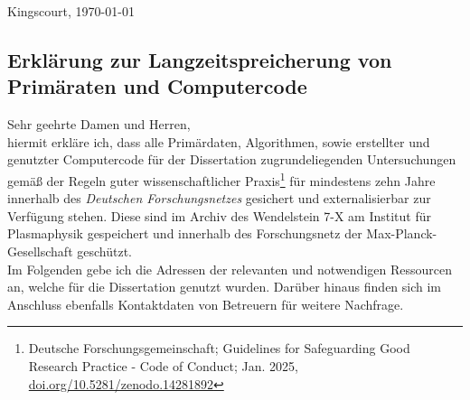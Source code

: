 \documentclass[
  fontsize=11pt,
  paper=a4,
]{report}
\begin{document}
    \pagestyle{empty}%

    \begin{flushright}
      Kingscourt, \today\\[1cm]%
    \end{flushright}

    \subsection*{%
        Erklärung zur Langzeitspreicherung von Primäraten und Computercode%
    }%
        \vspace*{0.5cm}%
        Sehr geehrte Damen und Herren,\\[0.5cm]%
%
    hiermit erkläre ich, dass alle Primärdaten, Algorithmen, sowie erstellter und genutzter Computercode für der Dissertation zugrundeliegenden Untersuchungen gemäß der Regeln guter wissenschaftlicher Praxis\footnote[1]{%
      Deutsche Forschungsgemeinschaft; Guidelines for Safeguarding Good Research Practice - Code of Conduct; Jan. 2025, \url{doi.org/10.5281/zenodo.14281892}%
    } für mindestens zehn Jahre innerhalb des \textit{Deutschen Forschungsnetzes} gesichert und externalisierbar zur Verfügung stehen. Diese sind im Archiv des Wendelstein 7-X am Institut für Plasmaphysik gespeichert und innerhalb des Forschungsnetz der Max-Planck-Gesellschaft geschützt.\\[0.5cm]%
%
    Im Folgenden gebe ich die Adressen der relevanten und notwendigen Ressourcen an, welche für die Dissertation genutzt wurden. Darüber hinaus finden sich im Anschluss ebenfalls Kontaktdaten von Betreuern für weitere Nachfrage.\\%
%
\end{document}
